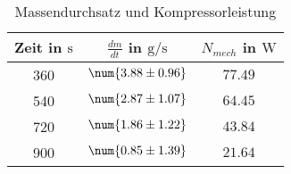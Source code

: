 \begin{table}
 \centering
 \begin{tabular}{S S S }
 \toprule
{Zeit in $\si{\second}$} & {$\frac{dm}{dt}$ in $\si{\gram \per \second}$} & {$N_{mech}$ in $\si{\watt}$}  \\
\midrule

360  & $\num{ 3.88 \pm 0.96 }$ & $\num{ 77.49  }$ \\

540  & $\num{ 2.87 \pm 1.07 }$ & $\num{ 64.45  }$ \\

720  & $\num{ 1.86 \pm 1.22 }$ & $\num{ 43.84  }$ \\

900  & $\num{ 0.85 \pm 1.39 }$ & $\num{ 21.64  }$ \\

\bottomrule
 \end{tabular}
 \caption{Massendurchsatz und Kompressorleistung}
 \label{tab: dmdtNmech}
  \end{table}
